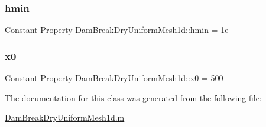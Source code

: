 \mbox{\label{class_dam_break_dry_uniform_mesh1d_a15f12736052b6387b532607f2096b6ac}} 
\subsubsection{\texorpdfstring{hmin}{hmin}}
{\footnotesize\ttfamily Constant Property Dam\+Break\+Dry\+Uniform\+Mesh1d\+::hmin = 1e}

\mbox{\label{class_dam_break_dry_uniform_mesh1d_ae7d744682921a6dadd123e97698266db}} 
\subsubsection{\texorpdfstring{x0}{x0}}
{\footnotesize\ttfamily Constant Property Dam\+Break\+Dry\+Uniform\+Mesh1d\+::x0 = 500}



The documentation for this class was generated from the following file\+:\begin{DoxyCompactItemize}
\item 
\hyperlink{_dam_break_dry_uniform_mesh1d_8m}{Dam\+Break\+Dry\+Uniform\+Mesh1d.\+m}\end{DoxyCompactItemize}
